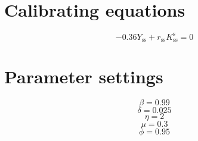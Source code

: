 \section{Calibrating equations}

\begin{equation}
-0.36Y_\mathrm{ss} + {r_\mathrm{ss}} {K^{\mathrm{s}}_\mathrm{ss}} = 0
\end{equation}



\section{Parameter settings}

\begin{equation}
\beta = 0.99
\end{equation}
\begin{equation}
\delta = 0.025
\end{equation}
\begin{equation}
\eta = 2
\end{equation}
\begin{equation}
\mu = 0.3
\end{equation}
\begin{equation}
\phi = 0.95
\end{equation}


